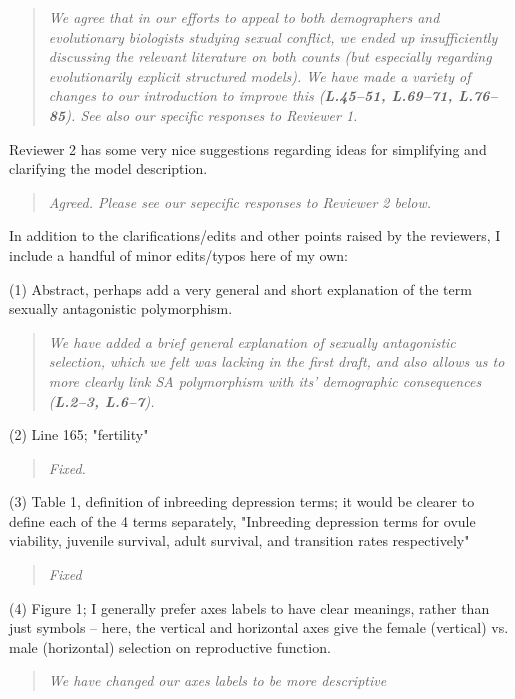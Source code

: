 \documentclass[11pt]{article}
\begin{document}
\begin{quote}
	{\itshape We agree that in our efforts to appeal to both demographers and evolutionary biologists studying sexual conflict, we ended up insufficiently discussing the relevant literature on both counts (but especially regarding evolutionarily explicit structured models). We have made a variety of changes to our introduction to improve this ({\bf L.45--51, L.69--71, L.76--85}). See also our specific responses to Reviewer 1. }
\end{quote}


Reviewer 2 has some very nice suggestions regarding ideas for simplifying and clarifying the model description.

\begin{quote}
	{\itshape Agreed. Please see our sepecific responses to Reviewer 2 below.}
\end{quote}

In addition to the clarifications/edits and other points raised by the reviewers, I include a handful of minor edits/typos here of my own:
\bigskip

\noindent (1) Abstract, perhaps add a very general and short explanation of the term sexually antagonistic polymorphism.
\begin{quote}
	{\itshape We have added a brief general explanation of sexually antagonistic selection, which we felt was lacking in the first draft, and also allows us to more clearly link SA polymorphism with its' demographic consequences ({\bf L.2--3, L.6--7}).}
\end{quote}

\noindent (2) Line 165; "fertility"
\begin{quote}
	{\itshape Fixed.}
\end{quote}

\noindent (3) Table 1, definition of inbreeding depression terms; it would be clearer to define each of the 4 terms separately, "Inbreeding depression terms for ovule viability, juvenile survival, adult survival, and transition rates respectively"
\begin{quote}
	{\itshape Fixed}
\end{quote}

\noindent (4) Figure 1; I generally prefer axes labels to have clear meanings, rather than just symbols – here, the vertical and horizontal axes give the female (vertical) vs. male (horizontal) selection on reproductive function.
\begin{quote}
	{\itshape We have changed our axes labels to be more descriptive }
\end{quote}
\end{document}
